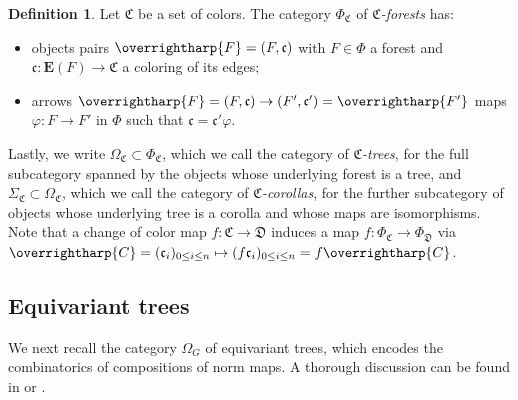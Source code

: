 \documentclass[a4paper,10pt
,draft
]{article}%
\numberwithin{equation}{section}
\numberwithin{figure}{section}
\theoremstyle{definition} %
\newtheorem{definition}[equation]{Definition}%
\newcommand{\vect}[1]{\text{\overrightharp{\ensuremath{#1}}}}
\newcommand{\1}{\ensuremath{\mathbbm 1}}%
\begin{document}
\begin{definition}\label{CFOREST_DEF}
      Let $\mathfrak C$ be a set of colors.
      The category $\Phi_{\mathfrak C}$ of \textit{$\mathfrak C$-forests} has:
      \begin{itemize}
      \item objects pairs $\vect F = (F, \mathfrak c)$ with
            $F \in \Phi$ a forest and
            $\mathfrak c \colon \boldsymbol{E}(F) \to \mathfrak C$ a coloring of its edges;
      \item arrows $\vect F = (F, \mathfrak c) \to (F', \mathfrak c') = \vect{F'}$ maps
            $\varphi \colon F \to F'$ in $\Phi$ such that $\mathfrak c = \mathfrak c' \varphi$.
      \end{itemize}      
	Lastly, we write
	$\Omega_{\mathfrak{C}} \subset \Phi_{\mathfrak{C}}$,
	which we call the category of 
	\emph{$\mathfrak{C}$-trees},
	for the full subcategory spanned by the objects 
	whose underlying forest is a tree,
	and 
	$\Sigma_{\mathfrak{C}} \subset \Omega_{\mathfrak{C}}$,
	which we call the category of 
	\emph{$\mathfrak{C}$-corollas},
	for the further subcategory of objects whose underlying tree is a corolla
	and whose maps are isomorphisms.
	Note that a change of color map
	$f \colon \mathfrak{C} \to \mathfrak{D}$
	induces a map
	$f \colon \Phi_\mathfrak{C} \to \Phi_\mathfrak{D}$ via $\vect{C} = (\mathfrak{c}_i)_{0\leq i \leq n}
	\mapsto
	(f\mathfrak{c}_i)_{0\leq i \leq n}= f\vect{C}$.
\end{definition}





\subsection{Equivariant trees}
\label{GTREES SEC}

We next recall the category $\Omega_G$ of equivariant trees, which encodes the combinatorics of compositions of norm maps.
A thorough discussion can be found in \cite[\S 5]{Per18} or \cite[\S 2]{BP_edss}.
\end{document}
